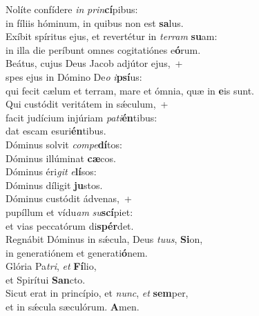 \evenverse Nolíte confídere \textit{in} \textit{prin}\textbf{cí}pibus:~\*\\
\evenverse in fíliis hóminum, in quibus non est \textbf{sa}lus.\\
\oddverse Exíbit spíritus ejus, et revertétur in \textit{ter}\textit{ram} \textbf{su}am:~\*\\
\oddverse in illa die períbunt omnes cogitatiónes e\textbf{ó}rum.\\
\evenverse Beátus, cujus Deus Jacob adjútor ejus,~+\\
\evenverse  spes ejus in Dómino De\textit{o} \textit{i}\textbf{psí}us:~\*\\
\evenverse qui fecit cælum et terram, mare et ómnia, quæ in \textbf{e}is sunt.\\
\oddverse Qui custódit veritátem in sǽculum,~+\\
\oddverse  facit judícium injúriam \textit{pa}\textit{ti}\textbf{én}tibus:~\*\\
\oddverse dat escam esuri\textbf{én}tibus.\\
\evenverse Dóminus solvit \textit{com}\textit{pe}\textbf{dí}tos:~\*\\
\evenverse Dóminus illúminat \textbf{cæ}cos.\\
\oddverse Dóminus éri\textit{git} \textit{e}\textbf{lí}sos:~\*\\
\oddverse Dóminus díligit \textbf{ju}stos.\\
\evenverse Dóminus custódit ádvenas,~+\\
\evenverse  pupíllum et vídu\textit{am} \textit{su}\textbf{scí}piet:~\*\\
\evenverse et vias peccatórum di\textbf{spér}det.\\
\oddverse Regnábit Dóminus in sǽcula, Deus \textit{tu}\textit{us}, \textbf{Si}on,~\*\\
\oddverse in generatiónem et generati\textbf{ó}nem.\\
\evenverse Glória Pa\textit{tri}, \textit{et} \textbf{Fí}lio,~\*\\
\evenverse et Spirítui \textbf{San}cto.\\
\oddverse Sicut erat in princípio, et \textit{nunc}, \textit{et} \textbf{sem}per,~\*\\
\oddverse et in sǽcula sæculórum. \textbf{A}men.\\
